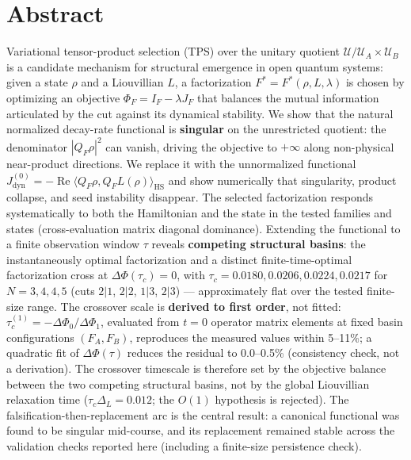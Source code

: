 \documentclass[
]{article}
\author{}
\date{}
\begin{document}
\section{Abstract}\label{abstract}

Variational tensor-product selection (TPS) over the unitary quotient
\(\mathcal{U}/\mathcal{U}_A \times \mathcal{U}_B\) is a candidate
mechanism for structural emergence in open quantum systems: given a
state \(\rho\) and a Liouvillian \(L\), a factorization
\(F^* = F^*(\rho, L, \lambda)\) is chosen by optimizing an objective
\(\Phi_F = I_F - \lambda J_F\) that balances the mutual information
articulated by the cut against its dynamical stability. We show that the
natural normalized decay-rate functional is \textbf{singular} on the
unrestricted quotient: the denominator \(|Q_F\rho|^2\) can vanish,
driving the objective to \(+\infty\) along non-physical near-product
directions. We replace it with the unnormalized functional
\(J_{\mathrm{dyn}}^{(0)} =
-\operatorname{Re}\langle Q_F\rho, Q_FL(\rho)\rangle_{\mathrm{HS}}\) and
show numerically that singularity, product collapse, and seed
instability disappear. The selected factorization responds
systematically to both the Hamiltonian and the state in the tested
families and states (cross-evaluation matrix diagonal dominance).
Extending the functional to a finite observation window \(\tau\) reveals
\textbf{competing structural basins}: the instantaneously optimal
factorization and a distinct finite-time-optimal factorization cross at
\(\Delta\Phi(\tau_c) = 0\), with
\(\tau_c = 0.0180, 0.0206, 0.0224, 0.0217\) for \(N = 3,4,4,5\) (cuts
\(2|1\), \(2|2\), \(1|3\), \(2|3\)) --- approximately flat over the
tested finite-size range. The crossover scale is \textbf{derived to
first order}, not fitted: \(\tau_c^{(1)} = -\Delta\Phi_0/\Delta\Phi_1\),
evaluated from \(t=0\) operator matrix elements at fixed basin
configurations \((F_A,F_B)\), reproduces the measured values within
5--11\%; a quadratic fit of \(\Delta\Phi(\tau)\) reduces the residual to
0.0--0.5\% (consistency check, not a derivation). The crossover
timescale is therefore set by the objective balance between the two
competing structural basins, not by the global Liouvillian relaxation
time (\(\tau_c \Delta_L = 0.012\); the \(O(1)\) hypothesis is rejected).
The falsification-then-replacement arc is the central result: a
canonical functional was found to be singular mid-course, and its
replacement remained stable across the validation checks reported here
(including a finite-size persistence check).
\end{document}

